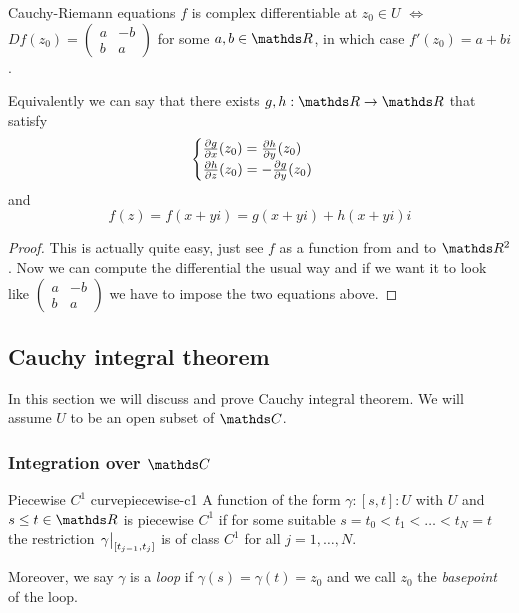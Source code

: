 \documentclass[12pt]{extarticle}
\begin{document}
\begin{proposition}{Cauchy-Riemann equations}{}
	$f$ is complex differentiable at $z_0 \in U$ $\iff$
	$Df(z_0) = \begin{pmatrix} a & -b \\ b & a \end{pmatrix}$ for some $a, b \in \R$, in which case
	$f'(z_0) = a + bi$.

	Equivalently we can say that there exists $g, h: \R \to \R$ that satisfy
	\begin{equation}
		\begin{cases}
			\pdv{g}{x}()(z_0) = \pdv{h}{y}()(z_0) \\
			\pdv{h}{z}()(z_0) = -\pdv{g}{y}()(z_0)
		\end{cases}
	\end{equation}
	and
	\begin{equation}
		f(z) = f(x + yi) = g(x+yi) + h(x+yi)i
	\end{equation}
\end{proposition}

\begin{proof}
	This is actually quite easy, just see $f$ as a function from and to $\R^2$.
	Now we can compute the differential the usual way and if we want it to look like
	$\begin{pmatrix} a & -b \\ b & a \end{pmatrix}$
	we have to impose the two equations above.
\end{proof}

\subsection{Cauchy integral theorem}

In this section we will discuss and prove Cauchy integral theorem.
We will assume $U$ to be an open subset of $\C$.

\subsubsection{Integration over \texorpdfstring{$\C$}{C}}

\begin{definition}{Piecewise $C^1$ curve}{piecewise-c1}
	A function of the form $\gamma: [s, t]: U$ with $U$ and $s \leq t \in \R$
	is piecewise $C^1$ if for some suitable $s = t_0 < t_1 < \dots < t_N = t$
	the restriction $\eval{\gamma}_{[t_{j-1}, t_j]}$ is of class $C^1$ for all $j = 1, \dots, N$.

	Moreover, we say $\gamma$ is a \emph{loop} if $\gamma(s) = \gamma(t) = z_0$ and we call $z_0$ the
	\emph{basepoint} of the loop.
\end{definition}
\end{document}
